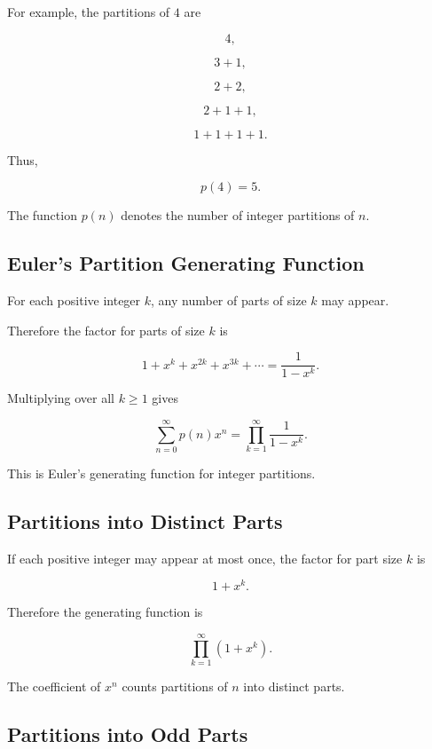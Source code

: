 For example, the partitions of \(4\) are

\[
4,
\]

\[
3+1,
\]

\[
2+2,
\]

\[
2+1+1,
\]

\[
1+1+1+1.
\]

Thus,

\[
p(4)=5.
\]

The function \(p(n)\) denotes the number of integer partitions of \(n\).

\subsection{Euler's Partition Generating Function}
\label{subsec:euler-partition-gf}

For each positive integer \(k\), any number of parts of size \(k\) may
appear.

Therefore the factor for parts of size \(k\) is

\[
1+x^k+x^{2k}+x^{3k}+\cdots
=
\frac{1}{1-x^k}.
\]

Multiplying over all \(k\geq1\) gives

\[
\boxed{
\sum_{n=0}^{\infty}p(n)x^n
=
\prod_{k=1}^{\infty}
\frac{1}{1-x^k}.
}
\]

This is Euler's generating function for integer partitions.

\subsection{Partitions into Distinct Parts}
\label{subsec:partitions-distinct-parts}

If each positive integer may appear at most once, the factor for part
size \(k\) is

\[
1+x^k.
\]

Therefore the generating function is

\[
\boxed{
\prod_{k=1}^{\infty}(1+x^k).
}
\]

The coefficient of \(x^n\) counts partitions of \(n\) into distinct
parts.

\subsection{Partitions into Odd Parts}
\label{subsec:partitions-odd-parts}


